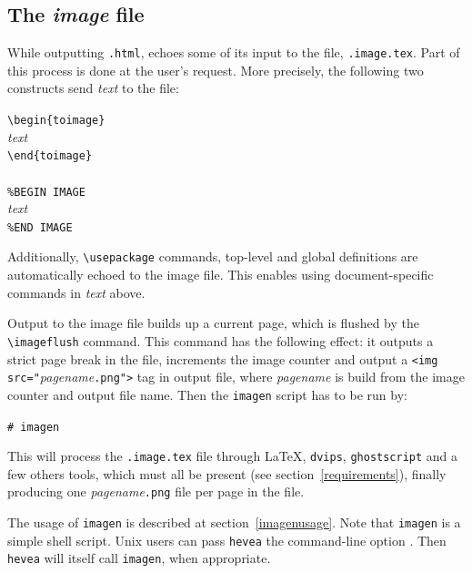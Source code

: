 \subsection{The \textit{image}\label{image:file} file}

While outputting \texttt{.html}, \hevea{} echoes some
of its input to the  file,
\texttt{.image.tex}.
Part of this process is done at the user's request.
More precisely, the following two constructs
send \textit{text} to the  file:
\begin{flushleft}
\verb+\begin{toimage}+\\
\textit{text}\\
\verb+\end{toimage}+\\
~\\
\verb+%BEGIN IMAGE+\\
\textit{text}\\
\verb+%END IMAGE+
\end{flushleft}
Additionally, \verb+\usepackage+ commands, top-level and global
definitions
are automatically echoed to the image file. This enables using
document-specific commands in \textit{text} above.


Output to the image file builds up a current page, which is flushed
by the \verb+\imageflush+ command.
This command has the following effect:  it outputs a strict page break
in the  file, increments the image counter and
output a \verb+<img src="+\textit{pagename}\verb+.png">+ tag in \hevea{}
output file, where \textit{pagename} is build from the image counter
and \hevea{} output file name.
Then the \verb+imagen+ script has to be run by:
\begin{flushleft}
\verb+# imagen+ 
\end{flushleft}
\noindent This will process the \texttt{.image.tex}
file through \LaTeX,
\texttt{dvips}, \texttt{ghostscript} and a few others tools, which must all be
present  (see section~\ref{requirements}), finally producing one
\textit{pagename}\texttt{.png} file per page in the 
file.

The  usage of \verb+imagen+  is described at
section~\ref{imagenusage}. Note that \texttt{imagen} is a simple shell
script. Unix users can pass \texttt{hevea} the command-line option
. Then \texttt{hevea} will
itself call \texttt{imagen}, when appropriate.





